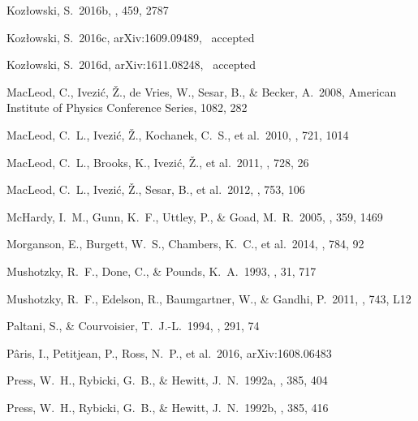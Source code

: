 \documentclass[twocolumn]{aastex6}
\begin{document}
\begin{thebibliography}{}
 Koz{\l}owski, S.\ 2016b, \mnras, 459, 2787 

 Koz{\l}owski, S.\ 2016c, arXiv:1609.09489, \apjs\ accepted

 Koz{\l}owski, S.\ 2016d, arXiv:1611.08248, \aap\ accepted

 MacLeod, C., Ivezi{\'c}, {\v Z}., de Vries, W., Sesar, B., \& Becker, A.\ 2008, American Institute of Physics Conference Series, 1082, 282 

 MacLeod, C.~L., Ivezi{\'c}, {\v Z}., Kochanek, C.~S., et al.\ 2010, \apj, 721, 1014 

 MacLeod, C.~L., Brooks, K., Ivezi{\'c}, {\v Z}., et al.\ 2011, \apj, 728, 26 

 MacLeod, C.~L., Ivezi{\'c}, {\v Z}., Sesar, B., et al.\ 2012, \apj, 753, 106

 McHardy, I.~M., Gunn, K.~F., Uttley, P., \& Goad, M.~R.\ 2005, \mnras, 359, 1469 

 Morganson, E., Burgett, W.~S., Chambers, K.~C., et al.\ 2014, \apj, 784, 92 

 Mushotzky, R.~F., Done, C., \& Pounds, K.~A.\ 1993, \araa, 31, 717 

 Mushotzky, R.~F., Edelson, R., Baumgartner, W., \& Gandhi, P.\ 2011, \apjl, 743, L12 

 Paltani, S., \& Courvoisier, T.~J.-L.\ 1994, \aap, 291, 74 

 P{\^a}ris, I., Petitjean, P., Ross, N.~P., et al.\ 2016, arXiv:1608.06483 

 Press, W.~H., Rybicki, G.~B., \& Hewitt, J.~N.\ 1992a, \apj, 385, 404 

 Press, W.~H., Rybicki, G.~B., \& Hewitt, J.~N.\ 1992b, \apj, 385, 416 



\end{thebibliography}
\end{document}
